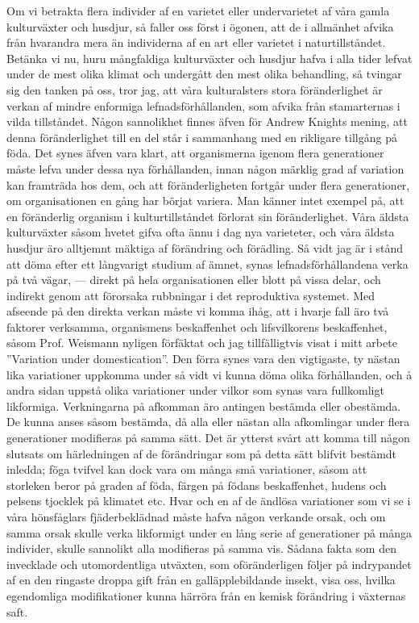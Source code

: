 Om vi betrakta flera individer af en varietet eller undervarietet af våra gamla kulturväxter och husdjur, så faller oss först i ögonen, att de i allmänhet afvika från hvarandra mera än individerna af en art eller varietet i naturtillståndet. Betänka vi nu, huru mångfaldiga kulturväxter och husdjur hafva i alla tider lefvat under de mest olika klimat och undergått den mest olika behandling, så tvingar sig den tanken på oss, tror jag, att våra kulturalsters stora föränderlighet är verkan af mindre enformiga lefnadsförhållanden, som afvika från stamarternas i vilda tillståndet. Någon sannolikhet finnes äfven för Andrew Knights mening, att denna föränderlighet till en del står i sammanhang med en rikligare tillgång på föda. Det synes äfven vara klart, att organismerna igenom flera generationer måste lefva under dessa nya förhållanden, innan någon märklig grad af variation kan framträda hos dem, och att föränderligheten fortgår under flera generationer, om organisationen en gång har börjat variera. Man känner intet exempel på, att en föränderlig organism i kulturtillståndet förlorat sin föränderlighet. Våra äldsta kulturväxter såsom hvetet gifva ofta ännu i dag nya varieteter, och våra äldsta husdjur äro alltjemnt mäktiga af förändring och förädling.
Så vidt jag är i stånd att döma efter ett långvarigt studium af ämnet, synas lefnadsförhållandena verka på två vägar, — direkt på hela organisationen eller blott på vissa delar, och indirekt genom att förorsaka rubbningar i det reproduktiva systemet. Med afseende på den direkta verkan måste vi komma ihåg, att i hvarje fall äro två faktorer verksamma, organismens beskaffenhet och lifsvilkorens beskaffenhet, såsom Prof. Weismann nyligen förfäktat och jag tillfälligtvis visat i mitt arbete ”Variation under domestication”. Den förra synes vara den vigtigaste, ty nästan lika variationer uppkomma under så vidt vi kunna döma olika förhållanden, och å andra sidan uppstå olika variationer under vilkor som synas vara fullkomligt likformiga. Verkningarna på afkomman äro antingen bestämda eller obestämda. De kunna anses såsom bestämda, då alla eller nästan alla afkomlingar under flera generationer modifieras på samma sätt. Det är ytterst svårt att komma till någon slutsats om härledningen af de förändringar som på detta sätt blifvit bestämdt inledda; föga tvifvel kan dock vara om många små variationer, såsom att storleken beror på graden af föda, färgen på födans beskaffenhet, hudens och pelsens tjocklek på klimatet etc. Hvar och en af de ändlösa variationer som vi se i våra hönsfåglars fjäderbeklädnad måste hafva någon verkande orsak, och om samma orsak skulle verka likformigt under en lång serie af generationer på många individer, skulle sannolikt alla modifieras på samma vis. Sådana fakta som den invecklade och utomordentliga utväxten, som oföränderligen följer på indrypandet af en den ringaste droppa gift från en galläpplebildande insekt, visa oss, hvilka egendomliga modifikationer kunna härröra från en kemisk förändring i växternas saft.

